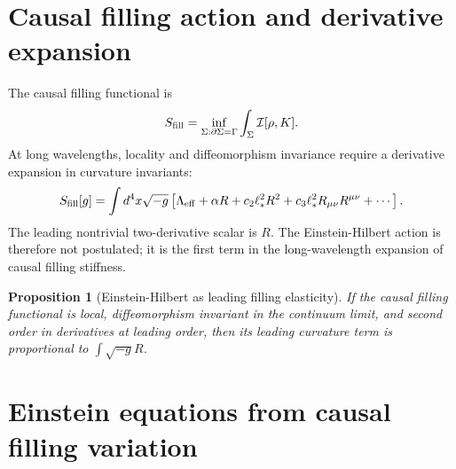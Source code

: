 \documentclass[11pt]{article}
\newtheorem{proposition}[definition]{Proposition}
\newcommand{\I}{\mathcal I}
\begin{document}
\section{Causal filling action and derivative expansion}

The causal filling functional is
\begin{equation}
S_{\rm fill}=\inf_{\Sigma:\partial\Sigma=\Gamma}\int_\Sigma\I[\rho,K].
\end{equation}
At long wavelengths, locality and diffeomorphism invariance require a derivative expansion in curvature invariants:
\begin{equation}
S_{\rm fill}[g]=\int d^4x\sqrt{-g}\left[\Lambda_{\rm eff}+\alpha R+c_2\ell_*^2R^2+c_3\ell_*^2R_{\mu\nu}R^{\mu\nu}+\cdots\right].
\end{equation}
The leading nontrivial two-derivative scalar is $R$. The Einstein-Hilbert action is therefore not postulated; it is the first term in the long-wavelength expansion of causal filling stiffness.

\begin{proposition}[Einstein-Hilbert as leading filling elasticity]
If the causal filling functional is local, diffeomorphism invariant in the continuum limit, and second order in derivatives at leading order, then its leading curvature term is proportional to $\int\sqrt{-g}R$.
\end{proposition}

\section{Einstein equations from causal filling variation}
\end{document}
